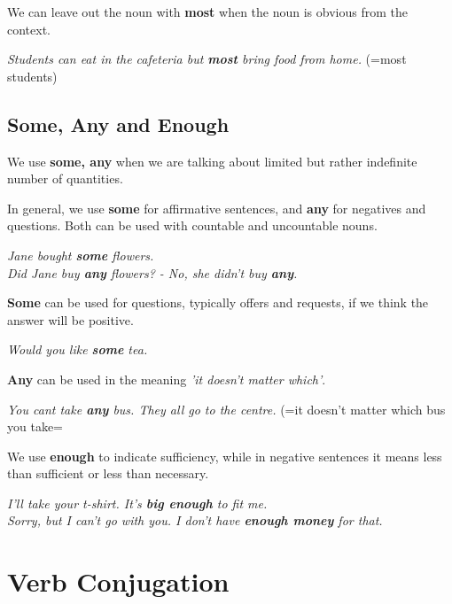 \documentclass[hidelinks,10pt,a4paper]{article}
\begin{document}
We can leave out the noun with \textbf{most} when the noun is obvious from the context.

\begin{center}
	\textit{Students can eat in the cafeteria but \textbf{most} bring food from home.} (=most students)
\end{center}

\subsection{Some, Any and Enough}

We use \textbf{some, any} when we are talking about limited but rather indefinite number of quantities.

In general, we use \textbf{some} for affirmative sentences, and \textbf{any} for negatives and questions. Both can be used with countable and uncountable nouns.
\begin{center}
	\textit{Jane bought \textbf{some} flowers. \\
	Did Jane buy \textbf{any} flowers? - No, she didn't buy \textbf{any}. }
\end{center}

\textbf{Some} can be used for questions, typically offers and requests, if we think the answer will be positive.

\begin{center}
	\textit{Would you like \textbf{some} tea.}
\end{center}

\textbf{Any} can be used in the meaning \textit{'it doesn't matter which'}.

\begin{center}
	\textit{You cant take \textbf{any} bus. They all go to the centre.} (=it doesn't matter which bus you take=
\end{center}

We use \textbf{enough} to indicate sufficiency, while in negative sentences it means less than sufficient or less than necessary.
\begin{center}
	\textit{I'll take your t-shirt. It's \textbf{big enough} to fit me. \\
	Sorry, but I can't go with you. I don't have \textbf{enough money} for that. }
\end{center}

\section{Verb Conjugation}
\end{document}
